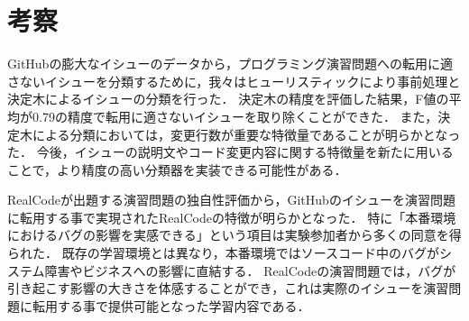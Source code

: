 \chapter{考察}
\graphicspath{{Chapter7/Figs/}}


GitHubの膨大なイシューのデータから，プログラミング演習問題への転用に適さないイシューを分類するために，我々はヒューリスティックにより事前処理と決定木によるイシューの分類を行った．
決定木の精度を評価した結果，F値の平均が0.79の精度で転用に適さないイシューを取り除くことができた．
また，決定木による分類においては，変更行数が重要な特徴量であることが明らかとなった．
今後，イシューの説明文やコード変更内容に関する特徴量を新たに用いることで，より精度の高い分類器を実装できる可能性がある．



RealCodeが出題する演習問題の独自性評価から，GitHubのイシューを演習問題に転用する事で実現されたRealCodeの特徴が明らかとなった．
特に「本番環境におけるバグの影響を実感できる」という項目は実験参加者から多くの同意を得られた．
既存の学習環境とは異なり，本番環境ではソースコード中のバグがシステム障害やビジネスへの影響に直結する．
RealCodeの演習問題では，バグが引き起こす影響の大きさを体感することができ，これは実際のイシューを演習問題に転用する事で提供可能となった学習内容である．





